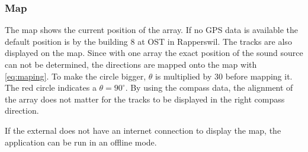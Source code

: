 \subsubsection*{Map}
The map shows the current position of the array.
If no GPS data is available the default position is by the 
building 8 at OST in Rapperswil. 
The tracks are also displayed on the map.
Since with one array the exact position of the sound source 
can not be determined, the directions are mapped onto the map with 
\ref*{eq:maping}. 
To make the circle bigger, $\theta$ is multiplied by 30 before mapping it.
The red circle indicates a $\theta = 90^\circ$.
By using the compass data, the alignment of the array does not matter 
for the tracks to be displayed in the right compass direction.

If the external does not have an internet connection to display the map,
the application can be run in an offline mode.